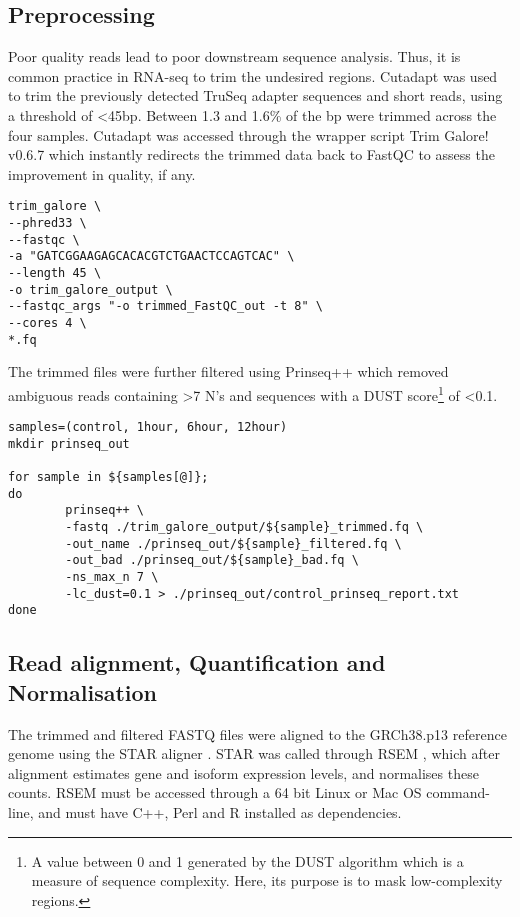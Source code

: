 \subsection{Preprocessing}%
Poor quality reads lead to poor downstream sequence analysis. Thus, it is common practice in RNA-seq to trim the undesired regions. Cutadapt \citep{martin2011cutadapt} was used to trim the previously detected TruSeq adapter sequences and short reads, using a threshold of <45\ac{bp}. Between 1.3 and 1.6\% of the \ac{bp} were trimmed across the four samples. Cutadapt was accessed through the wrapper script Trim Galore! v0.6.7 \citep{trimgalore} which instantly redirects the trimmed data back to FastQC to assess the improvement in quality, if any.

\begin{lstlisting}[caption=Trim Galore! trimming]
trim_galore \
--phred33 \
--fastqc \
-a "GATCGGAAGAGCACACGTCTGAACTCCAGTCAC" \
--length 45 \
-o trim_galore_output \
--fastqc_args "-o trimmed_FastQC_out -t 8" \
--cores 4 \
*.fq 
\end{lstlisting}

The trimmed files were further filtered using Prinseq++ \citep{prinseq++} which removed ambiguous reads containing >7 N's and sequences with a DUST score\footnote{A value between 0 and 1 generated by the DUST algorithm which is a measure of sequence complexity. Here, its purpose is to mask low-complexity regions.} of <0.1.

\begin{lstlisting}[caption=Prinseq++ filtering]
samples=(control, 1hour, 6hour, 12hour)
mkdir prinseq_out

for sample in ${samples[@]};
do
        prinseq++ \
        -fastq ./trim_galore_output/${sample}_trimmed.fq \
        -out_name ./prinseq_out/${sample}_filtered.fq \
        -out_bad ./prinseq_out/${sample}_bad.fq \
        -ns_max_n 7 \
        -lc_dust=0.1 > ./prinseq_out/control_prinseq_report.txt
done
\end{lstlisting}

\subsection{Read alignment, Quantification and Normalisation}
The trimmed and filtered FASTQ files were aligned to the GRCh38.p13 reference genome \citep{ref} using the \ac{STAR} aligner \citep{Dobin2013}. \ac{STAR} was called through RSEM \citep{li2011rsem}, which after alignment estimates gene and isoform expression levels, and normalises these counts. RSEM must be accessed through a 64 bit Linux or Mac OS command-line, and must have C++, Perl and R installed as dependencies.

